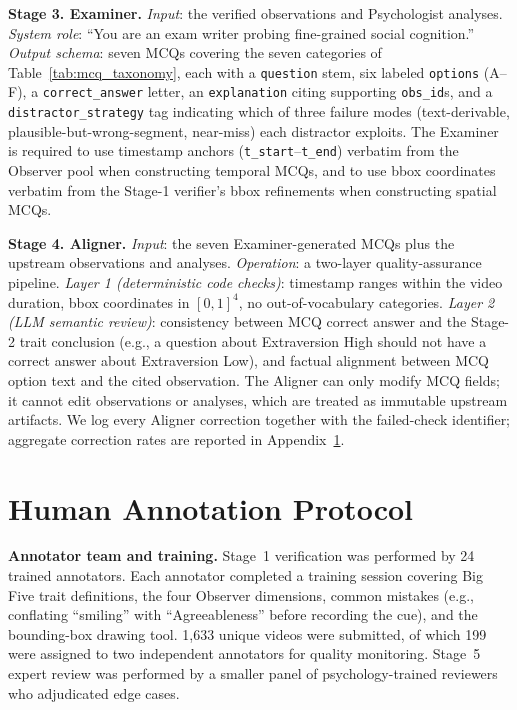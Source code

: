 \documentclass{llmxive}
\begin{document}
\noindent\textbf{Stage 3. Examiner.}
\emph{Input}: the verified observations and Psychologist analyses.
\emph{System role}: ``You are an exam writer probing fine-grained social cognition.''
\emph{Output schema}: seven MCQs covering the seven categories of Table~\ref{tab:mcq_taxonomy}, each with a \texttt{question} stem, six labeled \texttt{options} (A--F), a \texttt{correct\_answer} letter, an \texttt{explanation} citing supporting \texttt{obs\_id}s, and a \texttt{distractor\_strategy} tag indicating which of three failure modes (text-derivable, plausible-but-wrong-segment, near-miss) each distractor exploits. The Examiner is required to use timestamp anchors (\texttt{t\_start}--\texttt{t\_end}) verbatim from the Observer pool when constructing temporal MCQs, and to use bbox coordinates verbatim from the Stage-1 verifier's bbox refinements when constructing spatial MCQs.

\noindent\textbf{Stage 4. Aligner.}
\emph{Input}: the seven Examiner-generated MCQs plus the upstream observations and analyses.
\emph{Operation}: a two-layer quality-assurance pipeline. \emph{Layer 1 (deterministic code checks)}: timestamp ranges within the video duration, bbox coordinates in $[0, 1]^4$, no out-of-vocabulary categories. \emph{Layer 2 (LLM semantic review)}: consistency between MCQ correct answer and the Stage-2 trait conclusion (e.g., a question about Extraversion High should not have a correct answer about Extraversion Low), and factual alignment between MCQ option text and the cited observation. The Aligner can only modify MCQ fields; it cannot edit observations or analyses, which are treated as immutable upstream artifacts. We log every Aligner correction together with the failed-check identifier; aggregate correction rates are reported in Appendix~\ref{app:human}.

\section{Human Annotation Protocol}
\label{app:human}

\noindent\textbf{Annotator team and training.} Stage~1 verification was performed by 24 trained annotators. Each annotator completed a training session covering Big Five trait definitions, the four Observer dimensions, common mistakes (e.g., conflating ``smiling'' with ``Agreeableness'' before recording the cue), and the bounding-box drawing tool. 1,633 unique videos were submitted, of which 199 were assigned to two independent annotators for quality monitoring. Stage~5 expert review was performed by a smaller panel of psychology-trained reviewers who adjudicated edge cases.
\end{document}
